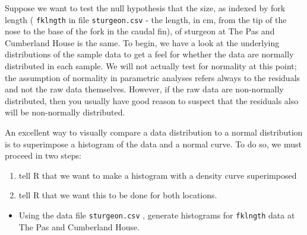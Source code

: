 \documentclass[
  12pt,
]{book}
\providecommand{\tightlist}{%
  \setlength{\itemsep}{0pt}\setlength{\parskip}{0pt}}
\begin{document}
Suppose we want to test the null hypothesis that the size, as indexed by fork length ( \texttt{fklngth} in file \texttt{sturgeon.csv} - the length, in cm, from the tip of the nose to the base of the fork in the caudal fin), of sturgeon at The Pas and Cumberland House is the same. To begin, we have a look at the underlying distributions of the sample data to get a feel for whether the data are normally distributed in each sample. We will not actually test for normality at this point; the assumption of normality in parametric analyses refers always to the residuals and not the raw data themselves. However, if the raw data are non-normally distributed, then you usually have good reason to suspect that the residuals also will be non-normally distributed.

An excellent way to visually compare a data distribution to a normal distribution is to superimpose a histogram of the data and a normal curve. To do so, we must proceed in two steps:

\begin{enumerate}
\def\labelenumi{\arabic{enumi}.}
\tightlist
\item
  tell R that we want to make a histogram with a density curve superimposed
\item
  tell R that we want this to be done for both locations.
\end{enumerate}

\begin{itemize}
\tightlist
\item
  Using the data file \texttt{sturgeon.csv} , generate histograms for \texttt{fklngth} data at The Pas and Cumberland House.
\end{itemize}
\end{document}
